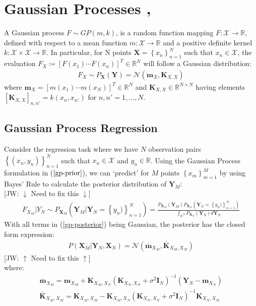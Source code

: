 \documentclass[twoside,11pt]{article}
\newcommand{\jw}[1]{{\color{gray} [JW: #1]}}
\begin{document}
\section{Gaussian Processes \cite{wild2022generalized}, \cite{wild2023connections}}
A Gaussian process $F \sim GP(m, k)$, is a random function mapping $F: \mathcal{X} \rightarrow \mathbb{R}$, defined with respect to a mean function $m: \mathcal{X} \rightarrow \mathbb{R}$ and a positive definite kernel $k: \mathcal{X} \times \mathcal{X} \rightarrow \mathbb{R}$. In particular, for N points $\mathbf{X} = \left\{ x_n\right\}_{n=1}^N$ such that $x_n \in \mathcal{X}$, the evaluation $F_X \coloneqq \left[F(x_1) \cdots F(x_n)\right]^T \in \mathbb{R}^N$ will follow a Gaussian distribution:
\begin{align}
    F_X \sim P_{\mathbf{X}}(\mathbf{Y}) = \mathcal{N}(\mathbf{m}_X, \mathbf{K}_{X, X})
    \label{gp-prior}
\end{align}
where $\mathbf{m}_X = \left[ m(x_1) \cdots m(x_N)\right]^T \in \mathbb{R}^N$ and $\mathbf{K}_{X, X} \in \mathbb{R}^{N \times N}$ having elements $\left[\mathbf{K}_{X, X}\right]_{n, n'} = k(x_n, x_{n'})$ for $n, n'=1,\dots, N$. 
\subsection{Gaussian Process Regression \cite{wild2023connections}}
Consider the regression task where we have $N$ observation pairs $\left\{(x_n, y_n)\right\}_{n=1}^N$ such that $x_n \in \mathcal{X}$ and $y_n \in \mathbb{R}$. Using the Gaussian Process formulation in ($\ref{gp-prior}$), we can `predict' for $M$ points $\left\{ x_m\right\}_{m=1}^M$ by using Bayes' Rule to calculate the posterior distribution of $\mathbf{Y}_M$:
\\\jw{$\downarrow$ Need to fix this $\downarrow$}
\begin{align}
    F_{X_M} \vert Y_N \sim P_{\mathbf{X}_M}(\mathbf{Y}_M | \mathbf{Y}_N= \left\{ y_n)\right\}_{n=1}^N) = \frac{ P_{\mathbf{X}_M}(\mathbf{Y}_M)  P_{\mathbf{X}_N}(\mathbf{Y}_N = \left\{ y_n)\right\}_{n=1}^N)}{\int_{\mathbb{R}^N} P_{\mathbf{X}_N}(\mathbf{Y}_N) d\mathbf{Y}_N}
    \label{gp-posterior}
\end{align}
With all terms in (\ref{gp-posterior}) being Gaussian, the posterior has the closed form expression:
\begin{align}
    P(\mathbf{X}_M |  \mathbf{Y}_N, \mathbf{X}_N) = \mathcal{N}(\bar{\mathbf{m}}_{X_M}, \bar{\mathbf{K}}_{X_M, X_M})
\end{align}
\jw{$\uparrow$ Need to fix this $\uparrow$}\\
where:
\begin{align}
    \label{gp-posterior-mean}
    \bar{\mathbf{m}}_{X_M} = \mathbf{m}_{X_M} + \mathbf{K}_{X_M, X_N} \left( \mathbf{K}_{X_N, X_N} + \sigma^2 \mathbf{I}_N\right)^{-1} \left( \mathbf{Y}_N - \mathbf{m}_{X_N}\right)\\
    \label{gp-posterior-covariance}
    \bar{\mathbf{K}}_{X_M, X_M} = \mathbf{K}_{X_M, X_M} - \mathbf{K}_{X_M, X_N}\left( \mathbf{K}_{X_N, X_N} + \sigma^2 \mathbf{I}_N\right)^{-1}\mathbf{K}_{X_N, X_M}
\end{align}
\end{document}
